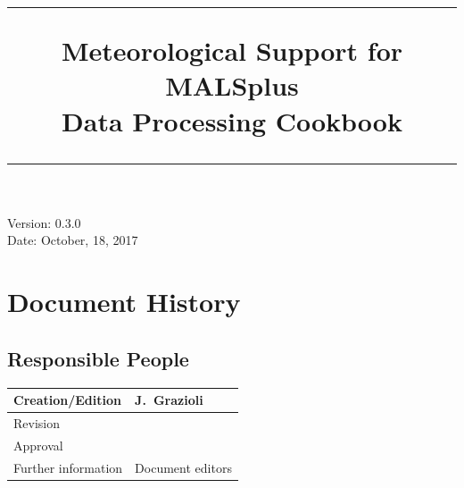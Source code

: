 \documentclass[a4paper,11pt,pdftex,twoside]{scrartcl}
\title{
  \begin{center}
    \vspace{-10mm}
    \rule{0.9\textwidth}{0.5pt}
    \vspace{7mm}
    {\bf \huge Meteorological Support for MALSplus}\\[10mm]
    {\bf \huge Data Processing Cookbook}\\
    \vspace{-3mm}
    \rule{0.9\textwidth}{0.5pt}
  \end{center}
}
\date{}
\begin{document}
\maketitle
\thispagestyle{empty} %
\vfill
Version: 0.3.0\\
Date: October, 18, 2017
\clearpage


\thispagestyle{empty} %

\section*{Document History}

\subsection*{Responsible People}
\begin{table}[H]
\begin{center}
\begin{tabularx}{\textwidth}{|l|X|}
  \hline
  Creation/Edition        & J.~Grazioli\\ \hline
  Revision                & \\  \hline
  Approval                & \\  \hline
  Further information     & Document editors\\  \hline
\end{tabularx}
\end{center}
\end{table}
\end{document}

